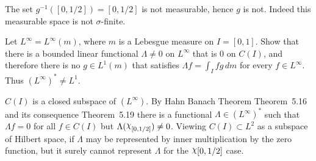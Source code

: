 \begin{enumerate}
The set \(g^{-1}([0,1/2]) = [0,1/2]\) is not measurable, hence $g$ is not.
Indeed this measurable space is not \(\sigma\)-finite.

\begin{excopy}
Let \(L^\infty = L^\infty(m) \), where $m$ is a Lebesgue measure on
\(I=[0,1]\). Show that there is a bounded linear functional \(\Lambda \neq 0\)
on \(L^\infty\) that is $0$ on \(C(I)\), and therefore there is no
\(g\in L^1(m)\) that satisfies
\(\Lambda f = \int_I fg\,dm\) for every \(f\in L^\infty\).
Thus \((L^\infty)^* \neq L^1\).
\end{excopy}

\(C(I)\) is a closed subspace of \((L^\infty)\).
By Hahn Banach Theorem
Theorem~5.16 \cite{RudinRCA87} 
and its consequence Theorem~5.19 there is a functional 
\(\Lambda\in (L^\infty)^*\) such that 
\(\Lambda f = 0\) for all \(f\in C(I)\) but 
\(\Lambda(\chhi_{[0,1/2]}) \neq 0\). Viewing \(C(I)\subset L^2\)
as a subspace of Hilbert space, if \(\Lambda\) may be represented
by inner multiplication by the zero function, but it surely cannot
represent \(\Lambda\) for the \(\chhi{[0,1/2]}\) case.


\end{enumerate}
